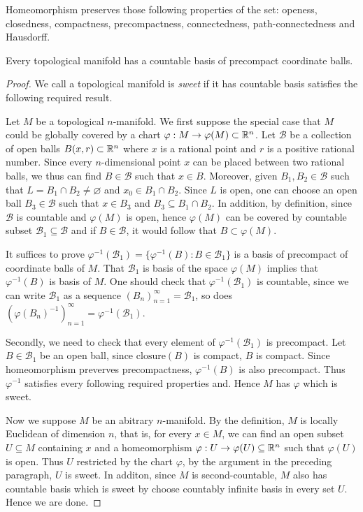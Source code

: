     \begin{proposition}
        Homeomorphism preserves those following properties of the set: openess, closedness, compactness, precompactness, connectedness, path-connectedness and Hausdorff.
    \end{proposition} 
    \begin{lemma}
Every topological manifold has a countable basis of precompact coordinate balls.
\end{lemma}
\begin{proof}
    We call a topological manifold is \textit{sweet} if it has countable basis satisfies the following required result.

    Let $M$ be a topological $n$-manifold. We first suppose the special case that $M$  could be globally covered by a chart $\varphi: M \to \varphi(M) \subset \mathbb{R}^n$. Let $\mathcal{B}$ be a collection of open balls $B(x,r) \subset \mathbb{R}^n$ where $x$ is a rational point and $r$ is a positive rational number. Since every $n$-dimensional point $x$ can be placed between two rational balls, we thus can find $B \in \mathcal{B}$ such that $x \in B$. Moreover, given $B_1, B_2 \in \mathcal{B}$ such that $ L = B_1 \cap B_2 \neq \varnothing$ and $x_0 \in B_1 \cap B_2$. Since $L$ is open, one can choose an open ball $B_3 \in \mathcal{B}$ such that $x \in B_3$ and $B_3 \subseteq B_1 \cap B_2$. In addition, by definition, since $\mathcal{B}$ is countable and $\varphi(M)$ is open, hence $\varphi(M)$ can be covered by countable subset $\mathcal{B}_1 \subseteq \mathcal{B}$ and if $B \in \mathcal{B}$, it would follow that  $B \subset \varphi(M)$. 

     It suffices to prove $\varphi^{-1}(\mathcal{B}_1) = \{\varphi^{-1}(B): B \in \mathcal{B}_1\}$ is a basis of precompact of coordinate balls of $M$. That $\mathcal{B}_1$ is basis of the space $\varphi(M)$ implies that $\varphi^{-1}(B)$ is basis of $M$. One should check that $\varphi^{-1}(\mathcal{B}_1)$ is countable, since we can write $\mathcal{B}_1$ as a sequence $(B_n)_{n = 1}^{\infty} = \mathcal{B}_1$, so does $(\varphi(B_n)^{-1})_{n = 1}^{\infty} = \varphi^{-1}(\mathcal{B}_1)$.

    Secondly, we need to check that every element of $\varphi^{-1}(\mathcal{B}_1)$ is precompact. Let $B \in \mathcal{B}_1$ be an open ball, since $\mathrm{closure}(B)$ is compact, $B$ is compact. Since homeomorphism preverves precompactness, $\varphi^{-1}(B) $ is also precompact. Thus $\varphi^{-1}$ satisfies every following required properties and. Hence $M$ has $\varphi$ which is sweet.

    Now we suppose $M$ be an abitrary $n$-manifold. By the definition, $M$ is locally Euclidean of dimension $n$, that is, for every $x \in M$, we can find an open subset $U \subseteq M$ containing $x$ and a homeomorphism $\varphi: U \to \varphi(U) \subseteq \mathbb{R}^n$ such that $\varphi(U)$ is open. Thus $U$ restricted by the chart $\varphi$, by the argument in the preceding paragraph, $U$ is sweet. In additon, since $M$ is second-countable, $M$ also has countable basis which is sweet by choose countably infinite basis in every set $U$. Hence we are done.
\end{proof}

